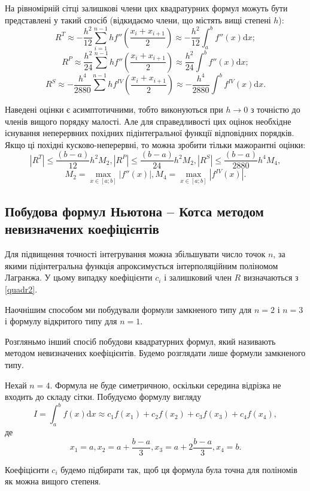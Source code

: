 \documentclass[14pt,twoside]{extreport}
\theoremstyle{mystyle}
\numberwithin{equation}{chapter}
\begin{document}
На рівномірній сітці залишкові члени цих квадратурних формул можуть бути представлені у такий спосіб (відкидаємо члени, що містять вищі степені $h$):
\[
 R^{T}\approx-\frac{h^{2}}{12}\sum_{i=1}^{n-1}hf''\left(\frac{x_{i}+x_{i+1}}{2}\right)\approx-\frac{h^{2}}{12}\int_{a}^{b}f''(x)\mathrm{d}x;
\]
\[
 R^{P}\approx\frac{h^{2}}{24}\sum^{n-1}hf''\left(\frac{x_{i}+x_{i+1}}{2}\right) \approx\frac{h^{2}}{24}\int^{b}f''(x)\mathrm{d}x;
\]
\[
 R^{S}\approx-\frac{h^{4}}{2880}\sum^{n-1}hf^{IV}\left(\frac{x_{i}+x_{i+1}}{2}\right) \approx-\frac{h^{4}}{2880}\int^{b}f^{IV}(x)\mathrm{d}x.
\]

Наведені оцінки є асимптотичними, тобто виконуються при $h \to 0$ з точністю до членів вищого порядку малості. Але для справедливості цих оцінок необхідне існування неперервних похідних підінтегральної функції відповідних порядків. Якщо ці похідні кусково-неперервні, то можна зробити тільки мажорантні оцінки:
\[
 |R^{T}|\displaystyle \leqslant \frac{(b-a)}{12}h^{2}M_{2}, |R^{P}|\leqslant \frac{(b-a)}{24}h^{2}M_{2}, |R^{S}| \leqslant \frac{(b-a)}{2880}h^{4}M_{4},
\]
\[
 M_{2}=\max\limits_{x\in[a; b]}|f''(x)|, M_{4}=\max\limits_{x\in[a; b]}|f^{IV}(x)|.
\]

\subsection{Побудова формул Ньютона -- Котса методом невизначених коефіцієнтів}

Для підвищення точності інтегрування можна збільшувати число точок $n$, за якими підінтегральна функція апроксимується інтерполяційним поліномом Лагранжа. У цьому випадку коефіцієнти $c_i$ і залишковий член $R$ визначаються з \eqref{quadr2}.

Наочнішим способом ми побудували формули замкненого типу для $n = 2$ і $n = 3$ і формулу відкритого типу для $n = 1$.

Розгляньмо інший спосіб побудови квадратурних формул, який називають методом невизначених коефіцієнтів. Будемо розглядати лише формули замкненого типу.

Нехай $n = 4$. Формула не буде симетричною, оскільки середина відрізка не входить до складу сітки. Побудуємо формулу вигляду
\[
 I=\int_{a}^{b}f(x)\mathrm{d}x\approx c_{1}f(x_{1})+c_{2}f(x_{2})+c_{3}f(x_{3})+c_{4}f(x_{4}),
\]
де
\[
 x_{1}=a, x_{2}=a+\frac{b-a}{3}, x_{3}=a+2\frac{b-a}{3}, x_{4}=b.
\]

Коефіцієнти $c_i$ будемо підбирати так, щоб ця формула була точна для поліномів як можна вищого степеня.
\end{document}
